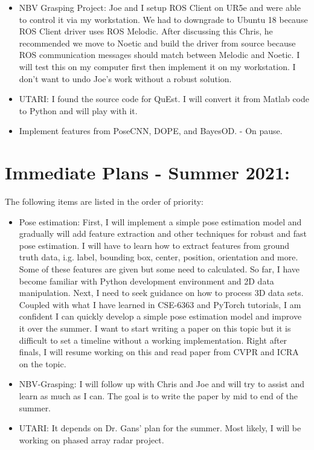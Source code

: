\documentclass[11pt]{article}
\begin{document}
\begin{itemize}
      \item NBV Grasping Project: Joe and I setup ROS Client on UR5e and were
      able to control it via my workstation. We had to downgrade to Ubuntu 18
      because ROS Client driver uses ROS Melodic. After discussing this Chris,
      he recommended we move to Noetic and build the driver from source because
      ROS communication messages should match between Melodic and Noetic. I will
      test this on my computer first then implement it on my workstation. I don't
      want to undo Joe's work without a robust solution.

      \item UTARI: I found the source code for QuEst. I will convert it from
      Matlab code to Python and will play with it.

      \item Implement features from PoseCNN, DOPE, and BayesOD. - On pause.
\end{itemize}


\section{Immediate Plans - Summer 2021:}
The following items are listed in the order of priority:

\begin{itemize}
      \item Pose estimation: First, I will implement a simple pose estimation
      model and gradually will add feature extraction and other techniques for
      robust and fast pose estimation. I will have to learn how to extract
      features from ground truth data, i.g. label, bounding box, center, position,
      orientation and more. Some of these features are given but some need to
      calculated. So far, I have become familiar with Python development
      environment and 2D data manipulation. Next, I need to seek guidance on
      how to process 3D data sets. Coupled with what I have learned in CSE-6363
      and PyTorch tutorials, I am confident I can quickly develop a simple
      pose estimation model and improve it over the summer. I want to start
      writing a paper on this topic but it is difficult to set a timeline
      without a working implementation. Right after finals, I will resume working
      on this and read paper from CVPR and ICRA on the topic.

      \item NBV-Grasping: I will follow up with Chris and Joe and will try to
      assist and learn as much as I can. The goal is to write the paper by mid
      to end of the summer.
      \item UTARI: It depends on Dr. Gans' plan for the summer. Most likely, I will
      be working on phased array radar project.
\end{itemize}
\end{document}
